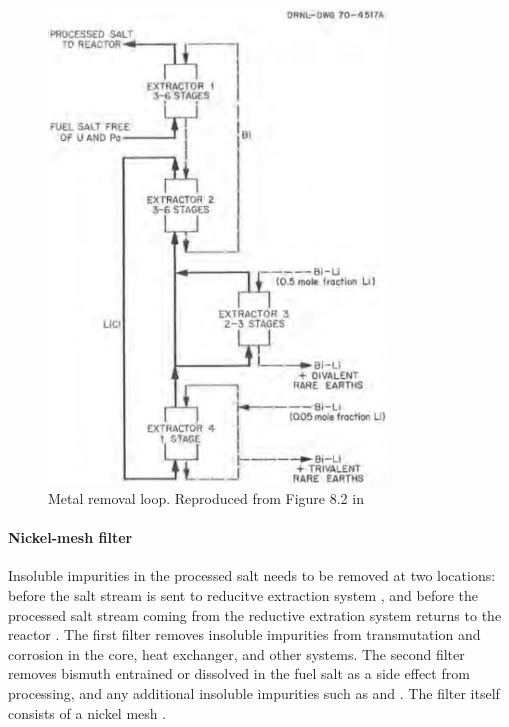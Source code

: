 \begin{figure}[htpb]
    \centering
    \includegraphics[width=0.8\textwidth]{figs/ch4/metal_removal_loop.png}
    \caption{Metal removal loop. Reproduced from Figure 8.2 in \cite{robertson_conceptual_1971}}
    \label{fig:metal-removal}
\end{figure}

\paragraph{Nickel-mesh filter}
Insoluble impurities in the processed salt needs to be removed at two locations:
before the salt stream is sent to reducitve extraction system
\cite{lindauer_design_1969}, and before the processed salt stream coming
from the reductive extration system returns to the
reactor \cite{robertson_conceptual_1971}. The first filter removes insoluble
impurities from transmutation and corrosion in the core, heat exchanger, and
other systems. The second filter removes  bismuth entrained or dissolved in the
fuel salt as a side effect from processing, and any additional insoluble
impurities such as  and . The filter itself consists of a
nickel mesh \cite{robertson_conceptual_1971}.


